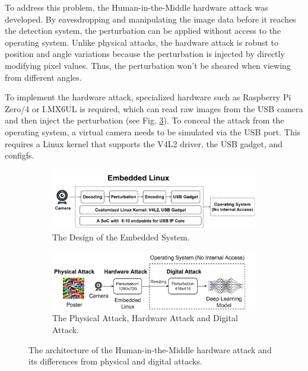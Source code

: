 
To address this problem, the Human-in-the-Middle  hardware attack was developed. By eavesdropping and manipulating the image data before it reaches the detection system, the perturbation can be applied without access to the operating system.  Unlike physical attacks, the hardware attack is robust to position and angle variations because the perturbation is injected by directly modifying pixel values. Thus, the perturbation won't be sheared when viewing from different angles.

To implement the hardware attack, specialized hardware such as Raspberry Pi Zero/4 or I.MX6UL is required, which can read raw images from the USB camera and then inject the perturbation (see Fig. \ref{fig:hardware}). To conceal the attack from the operating system, a virtual camera needs to be simulated via the USB port. This requires a Linux kernel that supports the V4L2 driver, the USB gadget, and configfs.

\begin{figure}[H]
    \centering
    \begin{subfigure}[b]{\textwidth}
    \centering
        \includegraphics[width=0.8\linewidth]{figures/chapter_detection/hardware/design.jpg}
        \caption{The Design of the Embedded System.}
        \label{fig:design}
    \end{subfigure}
    \begin{subfigure}[b]{\textwidth}
        \centering
        \includegraphics[width=0.9\linewidth]{figures/chapter_detection/hardware/minm_attack.jpg}
        \caption{The Physical Attack, Hardware Attack and Digital Attack.}
        \label{fig:comparison} 
    \end{subfigure}
  \caption{The architecture of the Human-in-the-Middle  hardware attack and its differences from physical and digital attacks.}
  \label{fig:hardware}
\end{figure}

